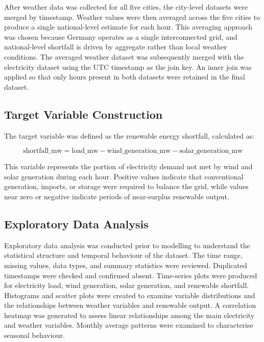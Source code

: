 \documentclass[conference]{IEEEtran}
\begin{document}
After weather data was collected for all five cities, the city-level datasets were merged by timestamp. Weather values were then averaged across the five cities to produce a single national-level estimate for each hour. This averaging approach was chosen because Germany operates as a single interconnected grid, and national-level shortfall is driven by aggregate rather than local weather conditions. The averaged weather dataset was subsequently merged with the electricity dataset using the UTC timestamp as the join key. An inner join was applied so that only hours present in both datasets were retained in the final dataset.
 
\subsection{Target Variable Construction}
 
The target variable was defined as the renewable energy shortfall, calculated as:
 
\begin{equation}
    \text{shortfall\_mw} = \text{load\_mw} - \text{wind\_generation\_mw} - \text{solar\_generation\_mw}
\end{equation}
 
This variable represents the portion of electricity demand not met by wind and solar generation during each hour. Positive values indicate that conventional generation, imports, or storage were required to balance the grid, while values near zero or negative indicate periods of near-surplus renewable output.
 
\subsection{Exploratory Data Analysis}
 
Exploratory data analysis was conducted prior to modelling to understand the statistical structure and temporal behaviour of the dataset. The time range, missing values, data types, and summary statistics were reviewed. Duplicated timestamps were checked and confirmed absent. Time-series plots were produced for electricity load, wind generation, solar generation, and renewable shortfall. Histograms and scatter plots were created to examine variable distributions and the relationships between weather variables and renewable output. A correlation heatmap was generated to assess linear relationships among the main electricity and weather variables. Monthly average patterns were examined to characterise seasonal behaviour.
 
\end{document}
